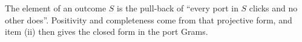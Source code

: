 
The element of an outcome $S$ is the pull-back of ``every port in $S$ clicks
and no other does''. Positivity and completeness come from that projective
form, and item (ii) then gives the closed form in the port Grams.

